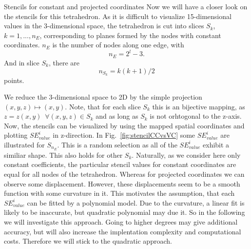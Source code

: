 \documentclass[a4paper,11pt,reqno]{amsart}
\numberwithin{figure}{section}
\numberwithin{table}{section}
\numberwithin{figure}{section}
\def\si{SE_{value}^i}
\begin{document}
\begin{section}{Stencils for constant and projected coordinates}
Now we will have a closer look on the stencils for this tetrahedron. As it is difficult 
to visualize 15-dimensional values in the 3-dimensional space, the tetrahedron is
cut into slices $S_k$, $k = 1,...,n_E$, corresponding to planes formed by the nodes
with constant coordinates.
$n_E$ is the number of nodes along one edge, with
\begin{equation}
n_E = 2^l-3.
\end{equation}
And in slice $S_k$, there are
\begin{equation}
n_{S_k} = k(k+1)/2
\end{equation}
points.

We reduce the 3-dimensional space to 2D by the simple projection $(x,y,z) \mapsto (x,y)$.
Note, that for each slice $S_k$ this is an bijective mapping, as 
$z = z(x,y)\enspace\forall(x,y,z)\in S_k$ and as long as $S_k$ is not orhtogonal to the
z-axis. Now, the stencils can be visualized by using
the mapped spatial coordinates and plotting $\si$ in z-direction. 
In Fig.~\ref{fig:stencilCCvsVC} some $\si$ are illustrated for $S_{n_E}$. This is a
random selection as all of the $\si$ exhibit a similiar shape. This also holds for other
$S_k$.
Naturally, as we consider here only constant coefficients, the particular stencil values 
for constant coordinates are equal for all nodes of the tetrahedron. Whereas for projected
coordinates we can observe some displacement. However, these displacements seem to
be a smooth function with some curvature in it. This motivates the assumption, that each
$\si$ can be fitted by a polynomial model. Due to the curvature, a linear fit is likely 
to be inaccurate, but quadratic polynomial may due it. So in the following we will 
investigate this approach.
Going to higher degrees may give additional accuracy, but will also increase the 
implentation complexity and computational costs. Therefore we will stick to the 
quadratic approach.



\end{section}
\end{document}
